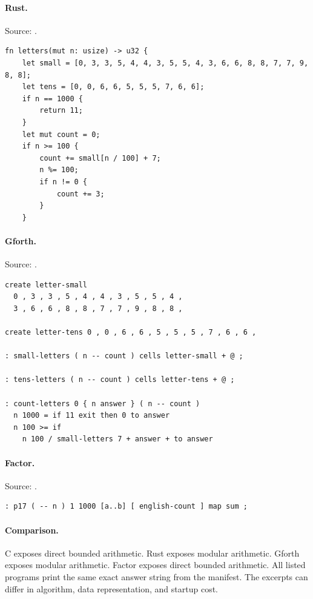 \paragraph{Rust.} Source: .
\begin{lstlisting}
fn letters(mut n: usize) -> u32 {
    let small = [0, 3, 3, 5, 4, 4, 3, 5, 5, 4, 3, 6, 6, 8, 8, 7, 7, 9, 8, 8];
    let tens = [0, 0, 6, 6, 5, 5, 5, 7, 6, 6];
    if n == 1000 {
        return 11;
    }
    let mut count = 0;
    if n >= 100 {
        count += small[n / 100] + 7;
        n %= 100;
        if n != 0 {
            count += 3;
        }
    }
\end{lstlisting}

\paragraph{Gforth.} Source: .
\begin{lstlisting}
create letter-small
  0 , 3 , 3 , 5 , 4 , 4 , 3 , 5 , 5 , 4 ,
  3 , 6 , 6 , 8 , 8 , 7 , 7 , 9 , 8 , 8 ,

create letter-tens 0 , 0 , 6 , 6 , 5 , 5 , 5 , 7 , 6 , 6 ,

: small-letters ( n -- count ) cells letter-small + @ ;

: tens-letters ( n -- count ) cells letter-tens + @ ;

: count-letters 0 { n answer } ( n -- count )
  n 1000 = if 11 exit then 0 to answer
  n 100 >= if
    n 100 / small-letters 7 + answer + to answer
\end{lstlisting}

\paragraph{Factor.} Source: .
\begin{lstlisting}
: p17 ( -- n ) 1 1000 [a..b] [ english-count ] map sum ;
\end{lstlisting}

\paragraph{Comparison.}
C exposes direct bounded arithmetic. Rust exposes modular arithmetic. Gforth exposes modular arithmetic. Factor exposes direct bounded arithmetic.
All listed programs print the same exact answer string from the manifest. The excerpts can differ in algorithm, data representation, and startup cost.

